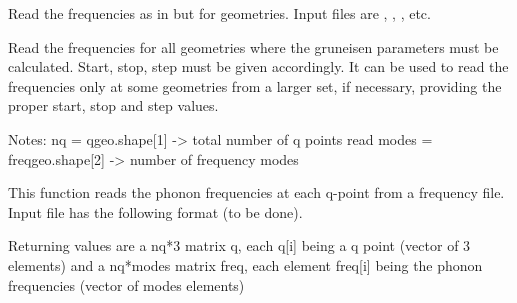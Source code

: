 \documentclass[letterpaper,10pt,english]{sphinxmanual}
\begin{document}

\begin{fulllineitems}
\label{pyqha:pyqha.read.read_freq_geo}
Read the frequencies as in {\hyperref[pyqha:pyqha.read.read_freq]{}} but for  geometries.
Input files are , , , etc.

\end{fulllineitems}


\begin{fulllineitems}
\label{pyqha:pyqha.read.read_freq_geo_old}
Read the frequencies for all geometries where the gruneisen parameters must be
calculated. Start, stop, step must be given accordingly. It can be used to read
the frequencies only at some geometries from a larger set, if necessary, 
providing the proper start, stop and step values.

Notes:
nq = qgeo.shape{[}1{]} -\textgreater{} total number of q points read
modes = freqgeo.shape{[}2{]} -\textgreater{} number of frequency modes

\end{fulllineitems}


\begin{fulllineitems}
\label{pyqha:pyqha.read.read_freq_old}
This function reads the phonon frequencies at each q-point from a frequency file.  
Input file has the following format (to be done).

Returning values are a nq*3 matrix q, each q{[}i{]} being a q point (vector of 3 elements)
and a nq*modes matrix freq, each element freq{[}i{]} being the phonon frequencies
(vector of modes elements)

\end{fulllineitems}

\end{document}
